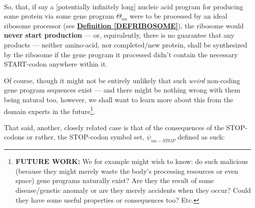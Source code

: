 \documentclass[a4paper, 18pt]{book} %
\newtheorem{law}{Law}
\begin{document}
\begin{center}
\\
\end{center}


So, that, if say a [potentially infinitely long] nucleic acid program for producing some protein via some gene program $\Theta_{na}$ were to be processed by an ideal ribosome processor (see \textbf{\hyperref[DEFRIBOSOME]{Definition \ref{DEFRIBOSOME}}}), the ribosome would \textbf{never start production} --- or, equivalently, there is no guarantee that any products --- neither amino-acid, nor completed/new protein, shall be synthesized by the ribosome if the gene program it processed didn't contain the necessary START-codon anywhere within it.

Of course, though it might not be entirely unlikely that such \textit{weird} non-coding gene program sequences exist --- and there might be nothing wrong with them being natural too, however, we shall want to learn more about this from the domain experts in the future\footnote{\textbf{FUTURE WORK:} We for example might wish to know: do such malicious (because they might merely waste the body's processing resources or even space) gene programs naturally exist? Are they the result of some disease/genetic anomaly or are they merely accidents when they occur? Could they have some useful properties or consequences too? Etc.}.

That said, another, closely related case is that of the consequences of the STOP-codons or rather, the STOP-codon symbol set, $\psi_{na-STOP}$ defined as such:
\end{document}

